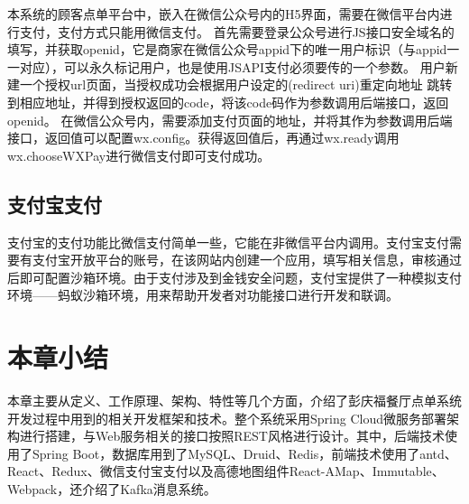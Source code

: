 本系统的顾客点单平台中，嵌入在微信公众号内的H5界面，需要在微信平台内进行支付，支付方式只能用微信支付。
首先需要登录公众号进行JS接口安全域名的填写，并获取openid，它是商家在微信公众号appid下的唯一用户标识（与appid一一对应），可以永久标记用户，也是使用JSAPI支付必须要传的一个参数。
用户新建一个授权url页面，当授权成功会根据用户设定的(redirect uri)重定向地址
跳转到相应地址，并得到授权返回的code，将该code码作为参数调用后端接口，返回openid。
在微信公众号内，需要添加支付页面的地址，并将其作为参数调用后端接口，返回值可以配置wx.config。获得返回值后，再通过wx.ready调用wx.chooseWXPay进行微信支付即可支付成功。\\

\subsection{支付宝支付}
支付宝的支付功能比微信支付简单一些，它能在非微信平台内调用。支付宝支付需要有支付宝开放平台的账号，在该网站内创建一个应用，填写相关信息，审核通过后即可配置沙箱环境。由于支付涉及到金钱安全问题，支付宝提供了一种模拟支付环境——蚂蚁沙箱环境，用来帮助开发者对功能接口进行开发和联调。

\section{本章小结}
本章主要从定义、工作原理、架构、特性等几个方面，介绍了彭庆福餐厅点单系统开发过程中用到的相关开发框架和技术。整个系统采用Spring Cloud微服务部署架构进行搭建，与Web服务相关的接口按照REST风格进行设计。其中，后端技术使用了Spring Boot，数据库用到了MySQL、Druid、Redis，前端技术使用了antd、React、Redux、微信支付宝支付以及高德地图组件React-AMap、Immutable、Webpack，还介绍了Kafka消息系统。
